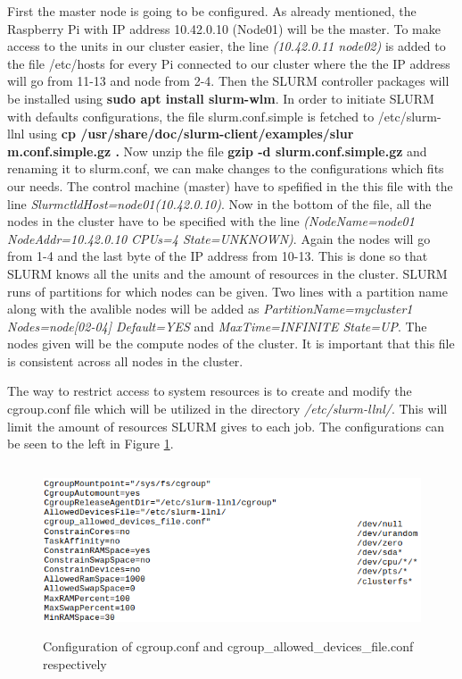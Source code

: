 \documentclass[../Head/Report.tex]{subfiles}
\begin{document}
First the master node is going to be configured. As already mentioned, the Raspberry Pi with IP address 10.42.0.10 (Node01) will be the master. To make access to the units in our cluster easier, the line \textit{(10.42.0.11 node02)} is added to the file /etc/hosts for every Pi connected to our cluster where the the IP address will go from 11-13 and node from 2-4. Then the SLURM controller packages will be installed using \textbf{sudo apt install slurm-wlm}. In order to initiate SLURM with defaults configurations, the file slurm.conf.simple is fetched to /etc/slurm-llnl using \textbf{cp /usr/share/doc/slurm-client/examples/slur} \textbf{m.conf.simple.gz .} Now unzip the file \textbf{gzip -d slurm.conf.simple.gz} and renaming it to slurm.conf, we can make changes to the configurations which fits our needs. The control machine (master) have to spefified in the this file with the line \textit{ SlurmctldHost=node01(10.42.0.10)}. Now in the bottom of the file, all the nodes in the cluster have to be specified with the line \textit{(NodeName=node01 NodeAddr=10.42.0.10 CPUs=4 State=UNKNOWN)}. Again the nodes will go from 1-4 and the last byte of the IP address from 10-13. This is done so that SLURM knows all the units and the amount of resources in the cluster. SLURM runs of partitions for which nodes can be given. Two lines with a partition name along with the avalible nodes will be added as \textit{PartitionName=mycluster1 Nodes=node[02-04] Default=YES} and \textit{MaxTime=INFINITE State=UP}. The nodes given will be the compute nodes of the cluster. It is important that this file is consistent across all nodes in the cluster.    

The way to restrict access to system resources is to create and modify the cgroup.conf file which will be utilized in the directory \textit{/etc/slurm-llnl/}. This will limit the amount of resources SLURM gives to each job. The configurations can be seen to the left in Figure \ref{fig:created_files}.     

\begin{figure}[H]
	\centering
	\includegraphics[height=5cm]{../Figures/created_files.png}
    \caption{Configuration of cgroup.conf and cgroup\_allowed\_devices\_file.conf respectively}
    \label{fig:created_files}
\end{figure}
\end{document}
